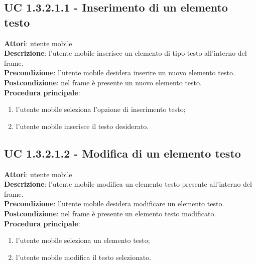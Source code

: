 \subsection{UC 1.3.2.1.1 - Inserimento di un elemento testo}{
	\label{uc1.3.2.1.1}
	\textbf{Attori}: utente mobile \\
	\textbf{Descrizione}: l'utente mobile inserisce un elemento di tipo testo all'interno del frame. \\
	\textbf{Precondizione}: l'utente mobile desidera inserire un nuovo elemento testo.	\\
	\textbf{Postcondizione}: nel frame è presente un nuovo elemento testo.	\\
	\textbf{Procedura principale}:
	\begin{enumerate}
		\item l'utente mobile seleziona l'opzione di inserimento testo;
		\item l'utente mobile inserisce il testo desiderato.
	\end{enumerate}
	}
\subsection{UC 1.3.2.1.2 - Modifica di un elemento testo}{
	\label{uc1.3.2.1.2}
	\textbf{Attori}: utente mobile \\
	\textbf{Descrizione}: l'utente mobile modifica un elemento testo presente all'interno del frame. \\
	\textbf{Precondizione}: l'utente mobile desidera modificare un elemento testo.	\\
	\textbf{Postcondizione}: nel frame è presente un elemento testo modificato.	\\
	\textbf{Procedura principale}:
	\begin{enumerate}
		\item l'utente mobile seleziona un elemento testo;
		\item l'utente mobile modifica il testo selezionato.
	\end{enumerate}
	}	
